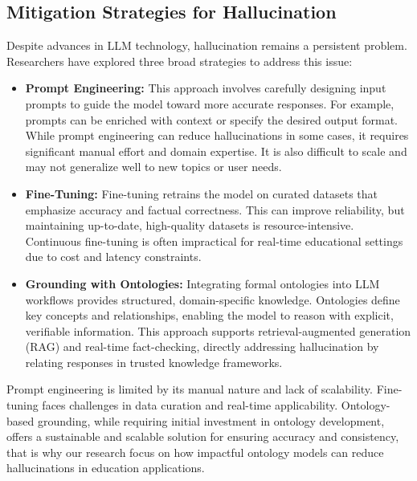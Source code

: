 \subsection{Mitigation Strategies for Hallucination}


Despite advances in LLM technology, hallucination remains a persistent problem. Researchers have explored three broad strategies to address this issue:

\begin{itemize}
    \item \textbf{Prompt Engineering:} This approach involves carefully designing input prompts to guide the model toward more accurate responses. For example, prompts can be enriched with context or specify the desired output format. While prompt engineering can reduce hallucinations in some cases, it requires significant manual effort and domain expertise. It is also difficult to scale and may not generalize well to new topics or user needs.
    \item \textbf{Fine-Tuning:} Fine-tuning retrains the model on curated datasets that emphasize accuracy and factual correctness. This can improve reliability, but maintaining up-to-date, high-quality datasets is resource-intensive. Continuous fine-tuning is often impractical for real-time educational settings due to cost and latency constraints.
    \item \textbf{Grounding with Ontologies:} Integrating formal ontologies into LLM workflows provides structured, domain-specific knowledge. Ontologies define key concepts and relationships, enabling the model to reason with explicit, verifiable information. This approach supports retrieval-augmented generation (RAG) and real-time fact-checking, directly addressing hallucination by relating responses in trusted knowledge frameworks.
\end{itemize}


Prompt engineering is limited by its manual nature and lack of scalability. Fine-tuning faces challenges in data curation and real-time applicability. Ontology-based grounding, while requiring initial investment in ontology development, offers a sustainable and scalable solution for ensuring accuracy and consistency, that is why our research focus on how impactful ontology models can reduce hallucinations in education applications.

